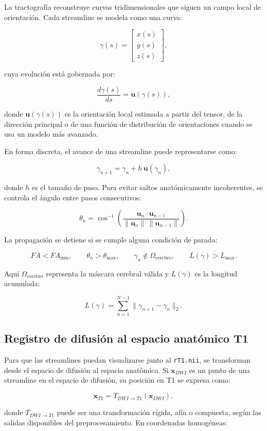 \documentclass[12pt,a4paper]{article}
\begin{document}
La tractografía reconstruye curvas tridimensionales que siguen un campo local de orientación. Cada streamline se modela como una curva:

\[
\gamma(s)=
\begin{bmatrix}
x(s)\\y(s)\\z(s)
\end{bmatrix},
\]

cuya evolución está gobernada por:

\[
\frac{d\gamma(s)}{ds}=\mathbf{u}(\gamma(s)),
\]

donde $\mathbf{u}(\gamma(s))$ es la orientación local estimada a partir del tensor, de la dirección principal o de una función de distribución de orientaciones cuando se usa un modelo más avanzado.

En forma discreta, el avance de una streamline puede representarse como:

\[
\gamma_{n+1}=\gamma_n+h\,\mathbf{u}(\gamma_n),
\]

donde $h$ es el tamaño de paso. Para evitar saltos anatómicamente incoherentes, se controla el ángulo entre pasos consecutivos:

\[
\theta_n =
\cos^{-1}
\left(
\frac{
\mathbf{u}_n\cdot\mathbf{u}_{n-1}
}
{
\|\mathbf{u}_n\|\,\|\mathbf{u}_{n-1}\|
}
\right).
\]

La propagación se detiene si se cumple alguna condición de parada:

\[
FA < FA_{\min},
\qquad
\theta_n>\theta_{\max},
\qquad
\gamma_n\notin \Omega_{\text{cerebro}},
\qquad
L(\gamma)>L_{\max}.
\]

Aquí $\Omega_{\text{cerebro}}$ representa la máscara cerebral válida y $L(\gamma)$ es la longitud acumulada:

\[
L(\gamma)=
\sum_{n=1}^{N-1}
\|\gamma_{n+1}-\gamma_n\|_2.
\]

\subsection{Registro de difusión al espacio anatómico T1}

Para que las streamlines puedan visualizarse junto al \texttt{rT1.nii}, se transforman desde el espacio de difusión al espacio anatómico. Si $\mathbf{x}_{DWI}$ es un punto de una streamline en el espacio de difusión, su posición en T1 se expresa como:

\[
\mathbf{x}_{T1}=T_{DWI\rightarrow T1}(\mathbf{x}_{DWI}),
\]

donde $T_{DWI\rightarrow T1}$ puede ser una transformación rígida, afín o compuesta, según las salidas disponibles del preprocesamiento. En coordenadas homogéneas:
\end{document}
